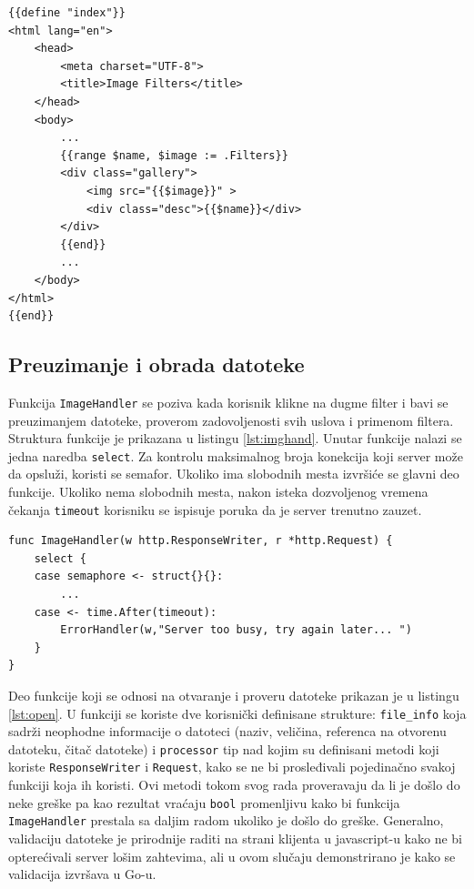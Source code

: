 \documentclass[12pt,oneside]{memoir}
\begin{document}
\begin{center}
\begin{lstlisting}[caption=Primer HTML šablona,label={lst:tmpl2},  backgroundcolor=\color{background}]
{{define "index"}}
<html lang="en">
	<head>
		<meta charset="UTF-8">
		<title>Image Filters</title>
	</head>
	<body>
		...
		{{range $name, $image := .Filters}}
		<div class="gallery">
			<img src="{{$image}}" >
			<div class="desc">{{$name}}</div>
		</div>
		{{end}}
		...
	</body>
</html>
{{end}}
\end{lstlisting}
\end{center}

\subsection{Preuzimanje i obrada datoteke}\label{appFile}

Funkcija \texttt{ImageHandler} se poziva kada korisnik klikne na dugme filter i bavi se preuzimanjem datoteke, proverom zadovoljenosti svih uslova i primenom filtera. Struktura funkcije je prikazana u listingu \ref{lst:imghand}. Unutar funkcije nalazi se jedna naredba \texttt{select}. Za kontrolu maksimalnog broja konekcija koji server može da opsluži, koristi se semafor. Ukoliko ima slobodnih mesta izvršiće se glavni deo funkcije. Ukoliko nema slobodnih mesta, nakon isteka dozvoljenog vremena čekanja \texttt{timeout} korisniku se ispisuje poruka da je server trenutno zauzet. 
 
\begin{center}
\begin{lstlisting}[caption=Struktura funkcije ImageHandler,label={lst:imghand},  backgroundcolor=\color{background}]
func ImageHandler(w http.ResponseWriter, r *http.Request) {
	select {
	case semaphore <- struct{}{}:
		...
	case <- time.After(timeout):
		ErrorHandler(w,"Server too busy, try again later... ")
	}
}

\end{lstlisting}
\end{center}

Deo funkcije koji se odnosi na otvaranje i proveru datoteke prikazan je u listingu \ref{lst:open}. U funkciji se koriste dve korisnički definisane strukture: \texttt{file\_info} koja sadrži neophodne informacije o datoteci (naziv, veličina, referenca na otvorenu datoteku, čitač datoteke) i \texttt{processor} tip nad kojim su definisani metodi koji koriste \texttt{ResponseWriter} i \texttt{Request}, kako se ne bi prosleđivali pojedinačno svakoj funkciji koja ih koristi. Ovi metodi tokom svog rada proveravaju da li je došlo do neke greške pa kao rezultat vraćaju \texttt{bool} promenljivu kako bi funkcija \texttt{ImageHandler} prestala sa daljim radom ukoliko je došlo do greške. Generalno, validaciju datoteke je prirodnije raditi na strani klijenta u javascript-u kako ne bi opterećivali server lošim zahtevima, ali u ovom slučaju demonstrirano je kako se validacija izvršava u Go-u.
\end{document}
